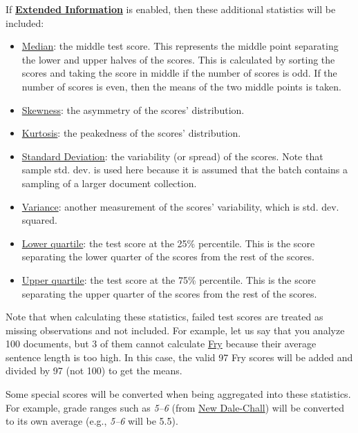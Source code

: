 \documentclass[
]{book}
\providecommand{\tightlist}{%
  \setlength{\itemsep}{0pt}\setlength{\parskip}{0pt}}
\theoremstyle{definition}
\theoremstyle{definition}
\theoremstyle{definition}
\theoremstyle{definition}
\theoremstyle{remark}
\begin{document}
If \protect\hyperlink{options-summary-report}{\textbf{Extended Information}} is enabled, then these additional statistics will be included:

\begin{itemize}
\tightlist
\item
  \protect\hyperlink{stat-terms}{Median}: the middle test score. This represents the middle point separating the lower and upper halves of the scores. This is calculated by sorting the scores and taking the score in middle if the number of scores is odd. If the number of scores is even, then the means of the two middle points is taken.
\item
  \protect\hyperlink{stat-terms}{Skewness}: the asymmetry of the scores' distribution.
\item
  \protect\hyperlink{stat-terms}{Kurtosis}: the peakedness of the scores' distribution.
\item
  \protect\hyperlink{stat-terms}{Standard Deviation}: the variability (or spread) of the scores. Note that sample std. dev. is used here because it is assumed that the batch contains a sampling of a larger document collection.
\item
  \protect\hyperlink{stat-terms}{Variance}: another measurement of the scores' variability, which is std. dev. squared.
\item
  \protect\hyperlink{stat-terms}{Lower quartile}: the test score at the 25\% percentile. This is the score separating the lower quarter of the scores from the rest of the scores.
\item
  \protect\hyperlink{stat-terms}{Upper quartile}: the test score at the 75\% percentile. This is the score separating the upper quarter of the scores from the rest of the scores.
\end{itemize}

Note that when calculating these statistics, failed test scores are treated as missing observations and not included. For example, let us say that you analyze 100 documents, but 3 of them cannot calculate \protect\hyperlink{fry-test}{Fry} because their average sentence length is too high. In this case, the valid 97 Fry scores will be added and divided by 97 (not 100) to get the means.

Some special scores will be converted when being aggregated into these statistics. For example, grade ranges such as \emph{5--6} (from \protect\hyperlink{dale-chall-test}{New Dale-Chall}) will be converted to its own average (e.g., \emph{5--6} will be 5.5).
\end{document}
